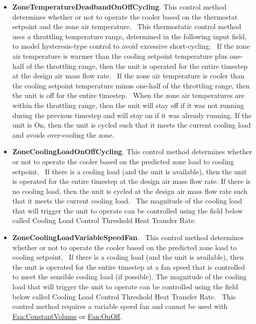 \begin{itemize}
\item
  \textbf{ZoneTemperatureDeadbandOnOffCycling}. This control method determines whether or not to operate the cooler based on the thermostat setpoint and the zone air temperature.~ This thermostatic control method uses a throttling temperature range, determined in the following input field, to model hysteresis-type control to avoid excessive short-cycling.~ If the zone air temperature is warmer than the cooling setpoint temperature plus one-half of the throttling range, then the unit is operated for the entire timestep at the design air mass flow rate.~ If the zone air temperature is cooler than the cooling setpoint temperature minus one-half of the throttling range, then the unit is off for the entire timestep.~ When the zone air temperatures are within the throttling range, then the unit will stay off if it was not running during the previous timestep and will stay on if it was already running. If the unit is On, then the unit is cycled such that it meets the current cooling load and avoids over-cooling the zone.
\item
  \textbf{ZoneCoolingLoadOnOffCycling}. This control method determines whether or not to operate the cooler based on the predicted zone load to cooling setpoint.~ If there is a cooling load (and the unit is available), then the unit is operated for the entire timestep at the design air mass flow rate. If there is no cooling load, then the unit is cycled at the design air mass flow rate such that it meets the current cooling load.~ The magnitude of the cooling load that will trigger the unit to operate can be controlled using the field below called Cooling Load Control Threshold Heat Transfer Rate.
\item
  \textbf{ZoneCoolingLoadVariableSpeedFan}.~ This control method determines whether or not to operate the cooler based on the predicted zone load to cooling setpoint.~ If there is a cooling load (and the unit is available), then the unit is operated for the entire timestep at a fan speed that is controlled to meet the sensible cooling load (if possible). The magnitude of the cooling load that will trigger the unit to operate can be controlled using the field below called Cooling Load Control Threshold Heat Transfer Rate.~ This control method requires a variable speed fan and cannot be used with \hyperref[fanconstantvolume]{Fan:ConstantVolume} or \hyperref[fanonoff]{Fan:OnOff}.
\end{itemize}


